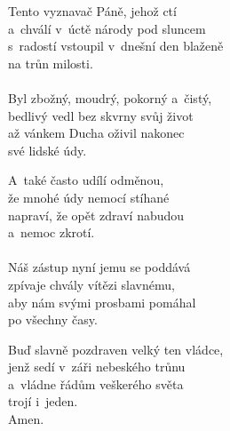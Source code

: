 \begin{translatioMulticol}{3}
Tento vyznavač Páně, jehož ctí\\
a~chválí v~úctě národy pod sluncem\\
s~radostí vstoupil v~dnešní den blaženě\\
na trůn milosti.\\
\\
Byl zbožný, moudrý, pokorný a~čistý,\\
bedlivý vedl bez skvrny svůj život\\
až vánkem Ducha oživil nakonec\\
své lidské údy.\columnbreak

A~také často udílí odměnou,\\
že mnohé údy nemocí stíhané\\
napraví, že opět zdraví nabudou\\
a~nemoc zkrotí.\\
\\
Náš zástup nyní jemu se poddává\\
zpívaje chvály vítězi slavnému,\\
aby nám svými prosbami pomáhal\\
po všechny časy.\columnbreak

Buď slavně pozdraven velký ten vládce,\\
jenž sedí v~záři nebeského trůnu\\
a~vládne řádům veškerého světa\\
trojí i~jeden.\\
Amen.
\end{translatioMulticol}
